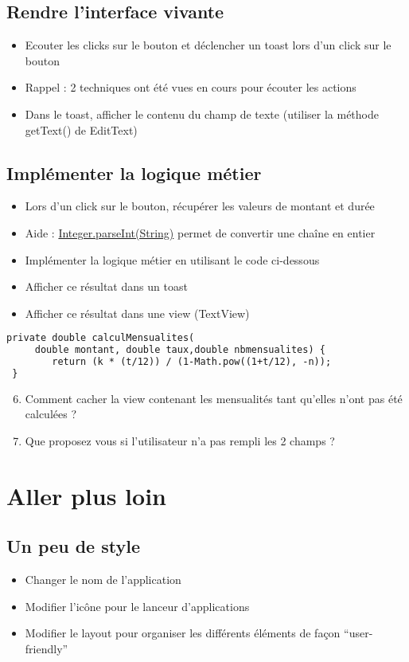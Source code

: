 \documentclass{article}
\begin{document}
\subsection{Rendre l'interface vivante}
\begin{itemize}
\item Ecouter les clicks sur le bouton et déclencher un toast lors d'un click sur le bouton
\item Rappel : 2 techniques ont été vues en cours pour écouter les actions
\item Dans le toast, afficher le contenu du champ de texte (utiliser la méthode getText() de EditText)
\end{itemize}
\subsection{Implémenter la logique métier}
\begin{itemize}
\item Lors d'un click sur le bouton, récupérer les valeurs de montant et durée
\item Aide : \href{http://developer.android.com/reference/java/lang/Integer.html#parseInt(java.lang.String)}{Integer.parseInt(String)} permet de convertir une chaîne en entier
\item Implémenter la logique métier en utilisant le code ci-dessous
\item Afficher ce résultat dans un toast
\item Afficher ce résultat dans une view (TextView)
\end{itemize}
 \begin{lstlisting}[language=XML]
 private double calculMensualites(
     double montant, double taux,double nbmensualites) {
    	return (k * (t/12)) / (1-Math.pow((1+t/12), -n));
 }
\end{lstlisting}

\begin{enumerate}
 \setcounter{enumi}{5}
\item Comment cacher la view contenant les mensualités tant qu'elles n'ont pas été calculées ?
\item Que proposez vous si l'utilisateur n'a pas rempli les 2 champs ?
\end{enumerate}
\newpage
\section{Aller plus loin}
\subsection{Un peu de style}
\begin{itemize}
\item Changer le nom de l'application
\item Modifier l'icône pour le lanceur d'applications
\item Modifier le layout pour organiser les différents éléments de façon ``user-friendly''
\end{itemize}
\end{document}
